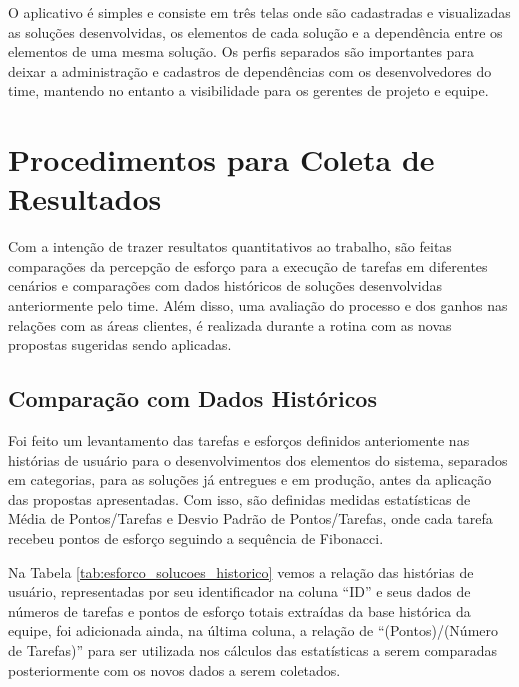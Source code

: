 	O aplicativo é simples e consiste em três telas onde são cadastradas e visualizadas as soluções desenvolvidas, os elementos de cada solução e a dependência entre os elementos de uma mesma solução.
	Os perfis separados são importantes para deixar a administração e cadastros de dependências com os desenvolvedores do time, mantendo no entanto a visibilidade para os gerentes de projeto e equipe.
	
	\section{Procedimentos para Coleta de Resultados}

	Com a intenção de trazer resultatos quantitativos ao trabalho, são feitas comparações da percepção de esforço para a execução de tarefas em diferentes cenários e
	comparações com dados históricos de soluções desenvolvidas anteriormente pelo time. Além disso, uma avaliação do processo e dos ganhos nas relações com as áreas clientes, é realizada durante a rotina com as novas propostas sugeridas sendo aplicadas.

	\subsection{Comparação com Dados Históricos}

	Foi feito um levantamento das tarefas e esforços definidos anteriomente nas histórias de usuário para o desenvolvimentos dos elementos do sistema, separados em categorias,
	para as soluções já entregues e em produção, antes da aplicação das propostas apresentadas. Com isso, são definidas medidas estatísticas de Média de Pontos/Tarefas e Desvio Padrão de Pontos/Tarefas,
	onde cada tarefa recebeu pontos de esforço seguindo a sequência de Fibonacci.
	
	Na Tabela \ref{tab:esforco_solucoes_historico} vemos a relação das histórias de usuário, representadas por seu identificador na coluna ``ID'' e seus dados de números de
	tarefas e pontos de esforço totais extraídas da	base histórica da equipe, foi adicionada ainda, na última coluna, a relação de ``(Pontos)/(Número de Tarefas)'' para ser
	utilizada nos cálculos das estatísticas a serem comparadas posteriormente com os novos dados a serem coletados.

